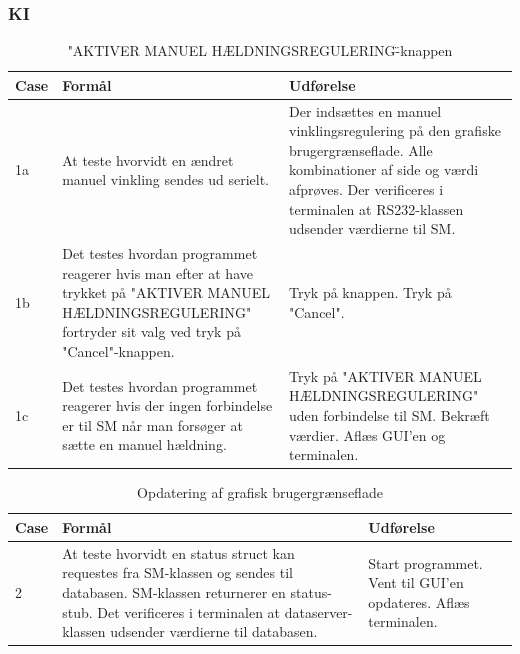 \subsubsection{KI}
\begin{table}[H]
\caption{"AKTIVER MANUEL HÆLDNINGSREGULERING\"-knappen}
\centering
\begin{tabular}{| p{1cm}  | p{4.5cm} | p{8cm} |}
\hline
Case &Formål &Udførelse\\\hline
1a &At teste hvorvidt en ændret manuel vinkling sendes ud serielt. &Der indsættes en manuel vinklingsregulering på den grafiske brugergrænseflade. Alle kombinationer af side og værdi afprøves. Der verificeres i terminalen at RS232-klassen udsender værdierne til SM.\\\hline

1b &Det testes hvordan programmet reagerer hvis man efter at have trykket på "AKTIVER MANUEL HÆLDNINGSREGULERING" fortryder sit valg ved tryk på "Cancel"-knappen.&Tryk på knappen. Tryk på "Cancel".\\\hline

1c &Det testes hvordan programmet reagerer hvis der ingen forbindelse er til SM når man forsøger at sætte en manuel hældning. &Tryk på "AKTIVER MANUEL HÆLDNINGSREGULERING"  uden forbindelse til SM. Bekræft værdier. Aflæs GUI'en og terminalen.\\\hline
\end{tabular}
\end{table}

\begin{table}[H]
\caption{Opdatering af grafisk brugergrænseflade}
\centering
\begin{tabular}{| p{1cm}  | p{4.5cm} | p{8cm} |}
\hline
Case &Formål &Udførelse\\\hline

2 &At teste hvorvidt en status struct kan requestes fra SM-klassen og sendes til databasen. SM-klassen returnerer en status-stub. Det verificeres i terminalen at dataserver-klassen udsender værdierne til databasen.&Start programmet. Vent til GUI'en opdateres. Aflæs terminalen.\\\hline
\end{tabular}
\end{table}


